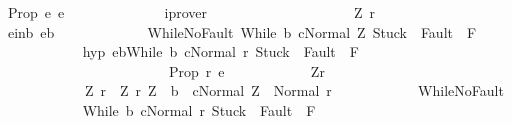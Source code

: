 \begin{isabellebody}
\ {\isachardoublequoteopen}{\isacharquery}Prop\ e\ e{\isachardoublequoteclose}\isanewline
\ \ \ \ \ \ \ \ \ \ \ \ \isamarkupfalse%
\ iprover\isanewline
\ \ \ \ \ \ \ \ \isamarkupfalse%
\isanewline
\ \ \ \ \ \ \ \ \ \ \isamarkupfalse%
\ Z\ r\isanewline
\ \ \ \ \ \ \ \ \ \ \isamarkupfalse%
\ e{\isacharunderscore}in{\isacharunderscore}b{\isacharcolon}\ {\isachardoublequoteopen}e{\isasymin}b{\isachardoublequoteclose}\ \isanewline
\ \ \ \ \ \ \ \ \ \ \isamarkupfalse%
\ WhileNoFault{\isacharcolon}\ {\isachardoublequoteopen}{\isasymGamma}{\isasymturnstile}{\isasymlangle}While\ b\ c{\isacharcomma}Normal\ Z{\isasymrangle}\ {\isasymRightarrow}{\isasymnotin}{\isacharparenleft}{\isacharbraceleft}Stuck{\isacharbraceright}\ {\isasymunion}\ Fault\ {\isacharbackquote}\ {\isacharparenleft}{\isacharminus}F{\isacharparenright}{\isacharparenright}{\isachardoublequoteclose}\isanewline
\ \ \ \ \ \ \ \ \ \ \isamarkupfalse%
\ hyp{\isacharcolon}\ {\isachardoublequoteopen}{\isasymlbrakk}e{\isasymin}b{\isacharsemicolon}{\isasymGamma}{\isasymturnstile}{\isasymlangle}While\ b\ c{\isacharcomma}Normal\ r{\isasymrangle}\ {\isasymRightarrow}{\isasymnotin}{\isacharparenleft}{\isacharbraceleft}Stuck{\isacharbraceright}\ {\isasymunion}\ Fault\ {\isacharbackquote}\ {\isacharparenleft}{\isacharminus}F{\isacharparenright}{\isacharparenright}{\isasymrbrakk}\isanewline
\ \ \ \ \ \ \ \ \ \ \ \ \ \ \ \ \ \ \ \ \ \ \ {\isasymLongrightarrow}\ {\isacharquery}Prop\ r\ e{\isachardoublequoteclose}\isanewline
\ \ \ \ \ \ \ \ \ \ \isamarkupfalse%
\ Z{\isacharunderscore}r{\isacharcolon}\isanewline
\ \ \ \ \ \ \ \ \ \ \ \ {\isachardoublequoteopen}{\isacharparenleft}Z{\isacharcomma}\ r{\isacharparenright}\ {\isasymin}\ {\isacharbraceleft}{\isacharparenleft}Z{\isacharcomma}\ r{\isacharparenright}{\isachardot}\ Z\ {\isasymin}\ b\ {\isasymand}\ {\isasymGamma}{\isasymturnstile}{\isasymlangle}c{\isacharcomma}Normal\ Z{\isasymrangle}\ {\isasymRightarrow}\ Normal\ r{\isacharbraceright}{\isachardoublequoteclose}\isanewline
\ \ \ \ \ \ \ \ \ \ \isamarkupfalse%
\ WhileNoFault\isanewline
\ \ \ \ \ \ \ \ \ \ \isamarkupfalse%
\ {\isachardoublequoteopen}{\isasymGamma}{\isasymturnstile}{\isasymlangle}While\ b\ c{\isacharcomma}Normal\ r{\isasymrangle}\ {\isasymRightarrow}{\isasymnotin}{\isacharparenleft}{\isacharbraceleft}Stuck{\isacharbraceright}\ {\isasymunion}\ Fault\ {\isacharbackquote}\ {\isacharparenleft}{\isacharminus}F{\isacharparenright}{\isacharparenright}{\isachardoublequoteclose}\isanewline

\end{isabellebody}

